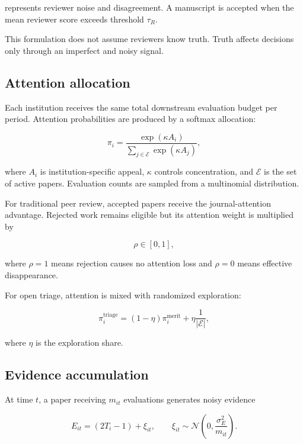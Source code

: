 represents reviewer noise and disagreement. A manuscript is accepted when the mean reviewer score exceeds threshold $\tau_R$.

This formulation does not assume reviewers know truth. Truth affects decisions only through an imperfect and noisy signal.

\subsection{Attention allocation}

Each institution receives the same total downstream evaluation budget per period. Attention probabilities are produced by a softmax allocation:

\begin{equation}
\pi_i = \frac{\exp(\kappa A_i)}{\sum_{j\in\mathcal{E}}\exp(\kappa A_j)},
\end{equation}

where $A_i$ is institution-specific appeal, $\kappa$ controls concentration, and $\mathcal{E}$ is the set of active papers. Evaluation counts are sampled from a multinomial distribution.

For traditional peer review, accepted papers receive the journal-attention advantage. Rejected work remains eligible but its attention weight is multiplied by

\begin{equation}
\rho\in[0,1],
\end{equation}

where $\rho=1$ means rejection causes no attention loss and $\rho=0$ means effective disappearance.

For open triage, attention is mixed with randomized exploration:

\begin{equation}
\pi_i^{\mathrm{triage}}
=(1-\eta)\pi_i^{\mathrm{merit}}
+\eta\frac{1}{|\mathcal{E}|},
\end{equation}

where $\eta$ is the exploration share.

\subsection{Evidence accumulation}

At time $t$, a paper receiving $m_{it}$ evaluations generates noisy evidence

\begin{equation}
E_{it}=(2T_i-1)+\xi_{it},
\qquad
\xi_{it}\sim\mathcal{N}\left(0,\frac{\sigma_E^2}{m_{it}}\right).
\end{equation}

